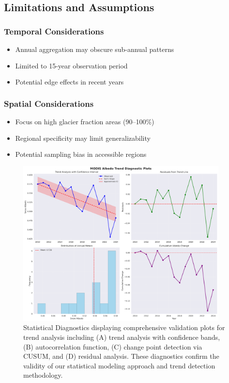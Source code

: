 \documentclass[12pt,a4paper]{article}
\begin{document}
\subsection{Limitations and Assumptions}

\subsubsection{Temporal Considerations}
\begin{itemize}
    \item Annual aggregation may obscure sub-annual patterns
    \item Limited to 15-year observation period
    \item Potential edge effects in recent years
\end{itemize}

\subsubsection{Spatial Considerations}
\begin{itemize}
    \item Focus on high glacier fraction areas (90--100\%)
    \item Regional specificity may limit generalizability
    \item Potential sampling bias in accessible regions
\end{itemize}

\begin{figure}[H]
\centering
\includegraphics[width=0.95\textwidth]{../../results/plots/trend_diagnostics.png}
\caption{Statistical Diagnostics displaying comprehensive validation plots for trend analysis including (A) trend analysis with confidence bands, (B) autocorrelation function, (C) change point detection via CUSUM, and (D) residual analysis. These diagnostics confirm the validity of our statistical modeling approach and trend detection methodology.}
\label{fig:trend_diagnostics}
\end{figure}
\end{document}
